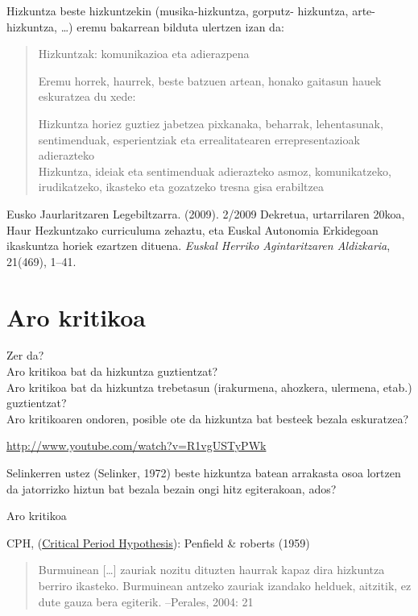 \documentclass[
]{book}
\begin{document}
Hizkuntza beste hizkuntzekin (musika-hizkuntza, gorputz- hizkuntza, arte-hizkuntza, \ldots) eremu bakarrean bilduta ulertzen izan da:

\begin{quote}
Hizkuntzak: komunikazioa eta adierazpena

Eremu horrek, haurrek, beste batzuen artean, honako gaitasun hauek eskuratzea du xede:

Hizkuntza horiez guztiez jabetzea pixkanaka, beharrak, lehentasunak, sentimenduak, esperientziak eta errealitatearen errepresentazioak adierazteko\\
Hizkuntza, ideiak eta sentimenduak adierazteko asmoz, komunikatzeko, irudikatzeko, ikasteko eta gozatzeko tresna gisa erabiltzea
\end{quote}

Eusko Jaurlaritzaren Legebiltzarra. (2009). 2/2009 Dekretua, urtarrilaren 20koa, Haur Hezkuntzako curriculuma zehaztu, eta Euskal Autonomia Erkidegoan ikaskuntza horiek ezartzen dituena. \emph{Euskal Herriko Agintaritzaren Aldizkaria}, 21(469), 1--41.

\hypertarget{aro-kritikoa}{%
\section{Aro kritikoa}\label{aro-kritikoa}}

Zer da?\\
Aro kritikoa bat da hizkuntza guztientzat?\\
Aro kritikoa bat da hizkuntza trebetasun (irakurmena, ahozkera, ulermena, etab.) guztientzat?\\
Aro kritikoaren ondoren, posible ote da hizkuntza bat besteek bezala eskuratzea?

\url{http://www.youtube.com/watch?v=R1vgUSTyPWk}

Selinkerren ustez (Selinker, 1972) beste hizkuntza batean arrakasta osoa lortzen da jatorrizko hiztun bat bezala bezain ongi hitz egiterakoan, ados?

Aro kritikoa

CPH, (\href{https://en.wikipedia.org/wiki/Critical_period_hypothesis}{Critical Period Hypothesis}): Penfield \& roberts (1959)

\begin{quote}
Burmuinean {[}\ldots{]} zauriak nozitu dituzten haurrak kapaz dira hizkuntza berriro ikasteko. Burmuinean antzeko zauriak izandako helduek, aitzitik, ez dute gauza bera egiterik. --Perales, 2004: 21
\end{quote}
\end{document}
